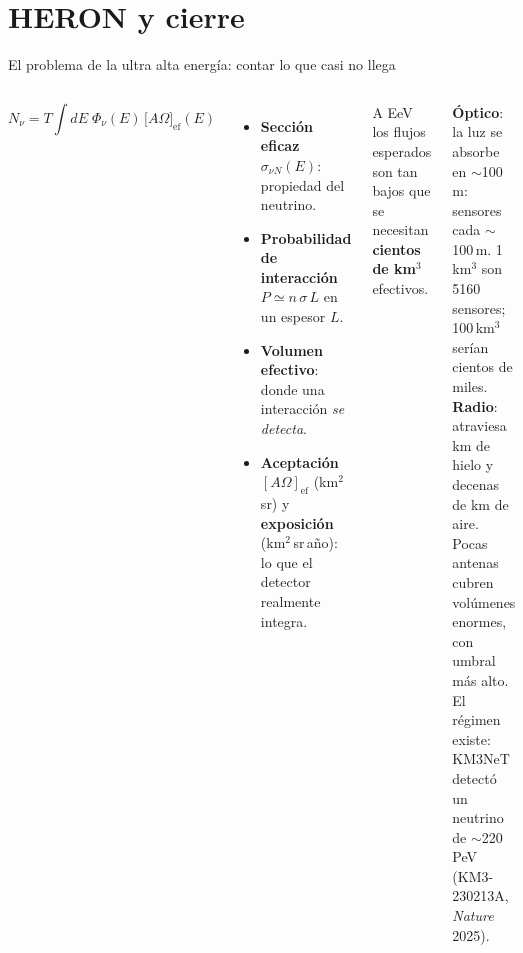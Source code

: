 \section{HERON y cierre}

\begin{frame}{El problema de la ultra alta energía: contar lo que casi no llega}
  \begin{columns}[c,onlytextwidth]
      \small
      \[ N_\nu = T\!\int\! dE\;\Phi_\nu(E)\,\big[A\Omega\big]_\mathrm{ef}(E) \]
      \vspace{-4pt}
      \begin{itemize}\footnotesize
        \item \textbf{Sección eficaz} $\sigma_{\nu N}(E)$: propiedad del neutrino.
        \item \textbf{Probabilidad de interacción} $P\simeq n\,\sigma\,L$ en un
          espesor $L$.
        \item \textbf{Volumen efectivo}: donde una interacción \emph{se detecta}.
        \item \textbf{Aceptación} $[A\Omega]_\mathrm{ef}$ (km$^2$\,sr) y
          \textbf{exposición} (km$^2$\,sr\,año): lo que el detector
          realmente integra.
      \end{itemize}
      \begin{clave}
        A EeV los flujos esperados son tan bajos que se necesitan
        \textbf{cientos de km$^3$} efectivos.
      \end{clave}
      \vspace{3pt}
      {\footnotesize
      \textbf{Óptico}: la luz se absorbe en $\sim$100\,m: sensores cada
      $\sim$100\,m. 1\,km$^3$ son 5160 sensores; 100\,km$^3$ serían cientos de
      miles.\\[3pt]
      \textbf{Radio}: atraviesa km de hielo y decenas de km de aire. Pocas
      antenas cubren volúmenes enormes, con umbral más alto.}\\[5pt]
      {\footnotesize\color{itedaGray} El régimen existe: KM3NeT detectó un
      neutrino de $\sim$220\,PeV (KM3-230213A, \textit{Nature} 2025).}
  \end{columns}
\end{frame}

